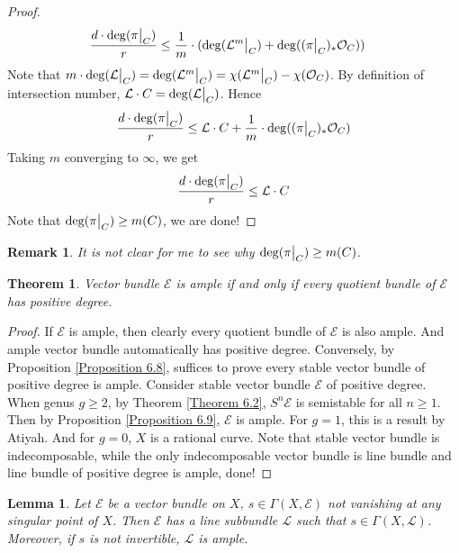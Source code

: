 \documentclass{ctexart}
\newtheorem{remark}{Remark}[section]
\newtheorem{theorem}{Theorem}[section]
\newtheorem{lemma}{Lemma}[section]
\begin{document}
\begin{proof}
\begin{equation}
\begin{split}
            \frac{d \cdot \deg (\pi\big{|}_{C})}{r} & \le \frac{1}{m} \cdot (\deg (\mathcal{L}^{m}\big{|}_{C}) + \deg ((\pi\big{|}_{C})_{\ast}\mathcal{O}_{C}))
        \end{split}
    \end{equation}
    Note that $m \cdot \deg (\mathcal{L}\big{|}_{C}) = \deg (\mathcal{L}^{m}\big{|}_{C}) = \chi(\mathcal{L}^{m}\big{|}_{C}) - \chi(\mathcal{O}_{C})$.
    By definition of intersection number, $\mathcal{L} \cdot C = \deg (\mathcal{L}\big{|}_{C})$.
    Hence
    \begin{equation}
        \frac{d \cdot \deg (\pi\big{|}_{C})}{r} \le \mathcal{L} \cdot C + \frac{1}{m} \cdot \deg ((\pi\big{|}_{C})_{\ast}\mathcal{O}_{C})
    \end{equation}
    Taking $m$ converging to $\infty$, we get  
    \begin{equation}
        \frac{d \cdot \deg (\pi\big{|}_{C})}{r} \le \mathcal{L} \cdot C
    \end{equation}
    Note that $\deg (\pi\big{|}_{C}) \ge m(C)$, we are done!
\end{proof}
\begin{remark}
    It is not clear for me to see why $\deg (\pi\big{|}_{C}) \ge m(C)$.
\end{remark}
\begin{theorem}
    Vector bundle $\mathcal{E}$ is ample if and only if every quotient bundle of $\mathcal{E}$ has positive degree.
    \label{Theorem 6.3}
\end{theorem}
\begin{proof}
    If $\mathcal{E}$ is ample, then clearly every quotient bundle of $\mathcal{E}$ is also ample.
    And ample vector bundle automatically has positive degree.
    Conversely, by Proposition \ref{Proposition 6.8}, suffices to prove every stable vector bundle of positive degree is ample.
    Consider stable vector bundle $\mathcal{E}$ of positive degree.
    When genus $g \ge 2$, by Theorem \ref{Theorem 6.2}, $S^{n}\mathcal{E}$ is semistable for all $n \ge 1$.
    Then by Proposition \ref{Proposition 6.9}, $\mathcal{E}$ is ample.
    For $g = 1$, this is a result by Atiyah.
    And for $g = 0$, $X$ is a rational curve.
    Note that stable vector bundle is indecomposable, 
    while the only indecomposable vector bundle is line bundle and line bundle of positive degree is ample, done!
\end{proof}
\begin{lemma}
    Let $\mathcal{E}$ be a vector bundle on $X$, $s\in \Gamma(X, \mathcal{E})$ not vanishing at any singular point of $X$.
    Then $\mathcal{E}$ has a line subbundle $\mathcal{L}$ such that $s\in \Gamma(X, \mathcal{L})$.
    Moreover, if $s$ is not invertible, $\mathcal{L}$ is ample.
    \label{Lemma 6.6}
\end{lemma}
\end{document}
